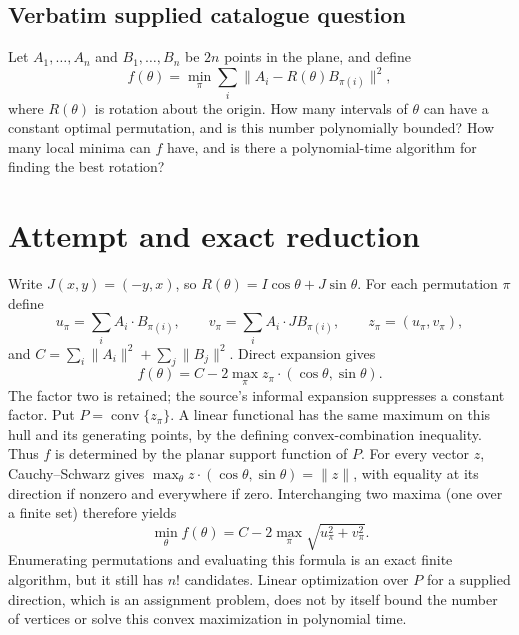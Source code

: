 \documentclass[11pt]{article}
\begin{document}
\subsection{Verbatim supplied catalogue question}
Let $A_1,\ldots,A_n$ and $B_1,\ldots,B_n$ be $2n$ points in the plane, and define $$f(\theta)=\min_{\pi}\sum_i\|A_i-R(\theta)B_{\pi(i)}\|^2,$$ where $R(\theta)$ is rotation about the origin. How many intervals of $\theta$ can have a constant optimal permutation, and is this number polynomially bounded? How many local minima can $f$ have, and is there a polynomial-time algorithm for finding the best rotation?

\section{Attempt and exact reduction}
Write $J(x,y)=(-y,x)$, so $R(\theta)=I\cos\theta+J\sin\theta$.
For each permutation $\pi$ define
\[
u_\pi=\sum_i A_i\cdot B_{\pi(i)},\qquad
v_\pi=\sum_i A_i\cdot J B_{\pi(i)},\qquad z_\pi=(u_\pi,v_\pi),
\]
and $C=\sum_i\|A_i\|^2+\sum_j\|B_j\|^2$. Direct expansion gives
\[
f(\theta)=C-2\max_\pi z_\pi\cdot(\cos\theta,\sin\theta).
\]
The factor two is retained; the source's informal expansion suppresses a
constant factor. Put $P=\operatorname{conv}\{z_\pi\}$.
A linear functional has the same maximum on this hull and its generating
points, by the defining convex-combination inequality. Thus $f$ is determined
by the planar support function of $P$.
For every vector $z$, Cauchy--Schwarz gives
$\max_\theta z\cdot(\cos\theta,\sin\theta)=\|z\|$, with equality
at its direction if nonzero and everywhere if zero. Interchanging two maxima
(one over a finite set) therefore yields
\[
\min_\theta f(\theta)=C-2\max_\pi\sqrt{u_\pi^2+v_\pi^2}.
\]
Enumerating permutations and evaluating this formula is an exact finite
algorithm, but it still has $n!$ candidates. Linear optimization over $P$
for a supplied direction, which is an assignment problem, does not by itself
bound the number of vertices or solve this convex maximization in polynomial time.
\end{document}
